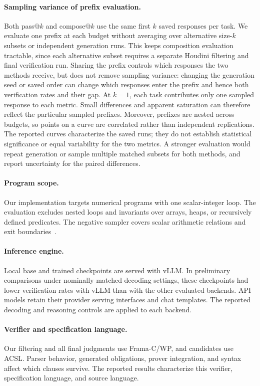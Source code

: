 \paragraph{Sampling variance of prefix evaluation.}
Both pass@\(k\) and compose@\(k\) use the same first \(k\) saved responses
per task.  We evaluate one prefix at each budget without averaging over
alternative size-\(k\) subsets or independent generation runs.  This keeps
composition evaluation tractable, since each alternative subset requires a
separate Houdini filtering and final verification run.  Sharing the prefix
controls which responses the two methods receive, but does not remove
sampling variance: changing the generation seed or saved order can change
which responses enter the prefix and hence both verification rates and their
gap.  At \(k{=}1\), each task contributes only one sampled response to each
metric.  Small differences and apparent saturation can therefore reflect the
particular sampled prefixes.  Moreover, prefixes are nested across budgets,
so points on a curve are correlated rather than independent replications.
The reported curves characterize the saved runs; they do not establish
statistical significance or equal variability for the two metrics.  A stronger
evaluation would repeat generation or sample multiple matched subsets for
both methods, and report uncertainty for the paired differences.

\paragraph{Program scope.}
Our implementation targets numerical programs with one scalar-integer loop.
The evaluation excludes nested loops and invariants over arrays, heaps, or
recursively defined predicates.  The negative sampler covers scalar arithmetic
relations and exit boundaries~\citep{liu2024towards}.

\paragraph{Inference engine.}
Local base and trained checkpoints are served with vLLM.  In preliminary
comparisons under nominally matched decoding settings, these checkpoints had
lower verification rates with vLLM than with the other evaluated backends.
API models retain their provider serving interfaces and chat templates.  The
reported decoding and reasoning controls are applied to each backend.

\paragraph{Verifier and specification language.}
Our filtering and all final judgments use Frama-C/WP, and candidates use ACSL.
Parser behavior, generated obligations, prover integration, and syntax affect
which clauses survive.  The reported results characterize this verifier,
specification language, and source language.

